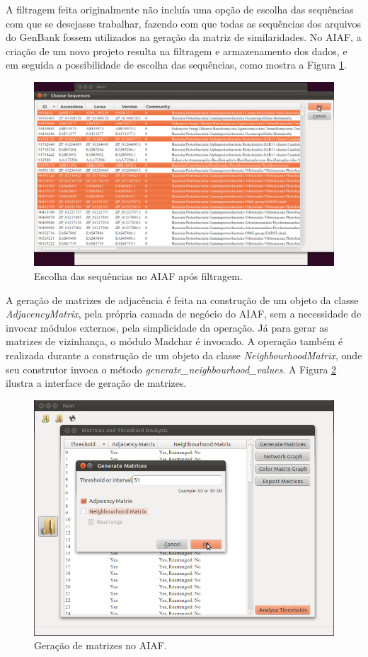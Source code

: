 A filtragem feita originalmente não incluía uma opção de escolha das sequências com que se desejasse trabalhar, fazendo com que todas as sequências dos
arquivos do GenBank fossem utilizados na geração da matriz de similaridades. No AIAF, a criação de um novo projeto resulta
na filtragem e armazenamento dos dados, e em seguida a possibilidade de escolha das sequências, como mostra a Figura \ref{fig:choose-sequences}.

\begin{figure}
\centering
\includegraphics[scale=0.38]{choose-sequences}
\caption{Escolha das sequências no AIAF após filtragem.}
\label{fig:choose-sequences}
\end{figure}

A geração de matrizes de adjacência é feita na construção de um objeto da classe \textit{AdjacencyMatrix}, pela própria camada de negócio do AIAF, sem a
necessidade de invocar módulos externos, pela simplicidade da operação. Já para gerar as matrizes de vizinhança, o módulo Madchar é invocado. A operação
também é realizada durante a construção de um objeto da classe \textit{NeighbourhoodMatrix}, onde seu construtor invoca o método
\textit{generate\_neighbourhood\_values}. A Figura \ref{fig:generate-matrices} ilustra a interface de geração de matrizes.

\begin{figure}
\centering
\includegraphics[scale=0.38]{generate-matrices}
\caption{Geração de matrizes no AIAF.}
\label{fig:generate-matrices}
\end{figure}

